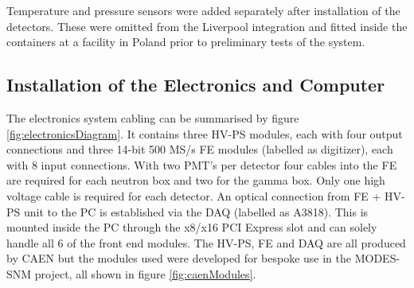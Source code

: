 Temperature and pressure sensors were added separately after installation of the detectors. These were omitted from the Liverpool integration and fitted inside the containers at a facility in Poland prior to preliminary tests of the system.

\subsection{Installation of the Electronics and Computer}
The electronics system cabling can be summarised by figure \ref{fig:electronicsDiagram}. It contains three HV-PS modules, each with four output connections and three 14-bit 500 MS/s FE modules (labelled as digitizer), each with 8 input connections. With two PMT's per detector four cables into the FE are required for each neutron box and two for the gamma box. Only one high voltage cable is required for each detector. An optical connection from FE + HV-PS unit to the PC is established via the DAQ (labelled as A3818). This is mounted inside the PC through the x8/x16 PCI Express slot and can solely handle all 6 of the front end modules. The HV-PS, FE and DAQ are all produced by CAEN but the modules used were developed for bespoke use in the MODES-SNM project, all shown in figure \ref{fig:caenModules}. 

